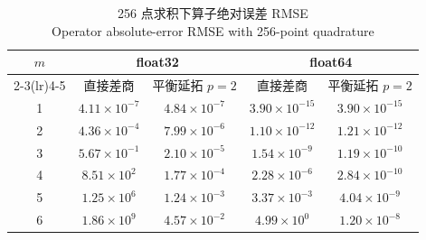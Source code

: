 \begin{table}[H]
\centering
\caption{256 点求积下算子绝对误差 RMSE\\Operator absolute-error RMSE with 256-point quadrature}
\label{tab:operator}
\small
\begin{tabular}{ccccc}
\toprule
\multirow{2}{*}{$m$} & \multicolumn{2}{c}{float32} & \multicolumn{2}{c}{float64}\\
\cmidrule(lr){2-3}\cmidrule(lr){4-5}
& 直接差商 & 平衡延拓 $p=2$ & 直接差商 & 平衡延拓 $p=2$\\
\midrule
1 & $4.11\times10^{-7}$ & $4.84\times10^{-7}$ & $3.90\times10^{-15}$ & $3.90\times10^{-15}$\\
2 & $4.36\times10^{-4}$ & $7.99\times10^{-6}$ & $1.10\times10^{-12}$ & $1.21\times10^{-12}$\\
3 & $5.67\times10^{-1}$ & $2.10\times10^{-5}$ & $1.54\times10^{-9}$ & $1.19\times10^{-10}$\\
4 & $8.51\times10^{2}$ & $1.77\times10^{-4}$ & $2.28\times10^{-6}$ & $2.84\times10^{-10}$\\
5 & $1.25\times10^{6}$ & $1.24\times10^{-3}$ & $3.37\times10^{-3}$ & $4.04\times10^{-9}$\\
6 & $1.86\times10^{9}$ & $4.57\times10^{-2}$ & $4.99\times10^{0}$ & $1.20\times10^{-8}$\\
\bottomrule
\end{tabular}
\end{table}
